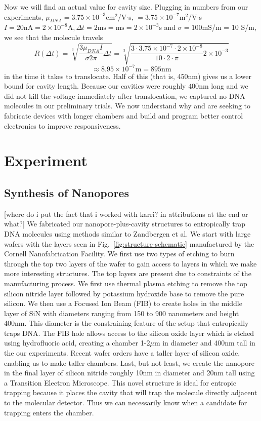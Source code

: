 \documentclass[aps,prl,preprint,groupedaddress]{revtex4}
\begin{document}
Now we will find an actual value for cavity size.
Plugging in numbers from our experiments, \(\mu_{DNA} = 3.75 \times 10^{-3}\)cm$^2$/V$\cdot$s, \( = 3.75 \times 10^{-7}\)m$^2$/V$\cdot$s \cite{mobility} \(I = 20 \mathrm{nA} = 2\times 10^{-8}\mathrm{A}, \Delta t = 2\mathrm{ms} = \mathrm{ms} = 2 \times 10^{-3}\)s and \(\sigma = 100\)mS/m = 10 S/m\cite{CRC}, we see that the molecule travels \[R(\Delta t) = \sqrt[3]{\frac{3 \mu_{DNA} I}{\sigma 2 \pi}\Delta t} = \sqrt[3]{\frac{3\cdot 3.75\times 10^{-7}\cdot 2\times10^{-8}}{10\cdot 2\cdot \pi} 2\times10^{-3}}\] \[\approx 8.95 \times 10^{-7}\mathrm{m} = 895 \mathrm{nm} \] in the time it takes to translocate.
Half of this (that is, 450nm) gives us a lower bound for cavity length.
Because our cavities were roughly \(400\)nm long and we did not kill the voltage immediately after translocation, we captured no DNA molecules in our preliminary trials.
We now understand why and are seeking to fabricate devices with longer chambers and build and program better control electronics to improve responsiveness.


\section{Experiment}

\subsection{Synthesis of Nanopores}

[where do i put the fact that i worked with karri? in attributions at the end or what?]
We fabricated our nanopore-plus-cavity structures to entropically trap DNA molecules using methods similar to Zandbergen et al.\cite{nanopore-fabrication}
We start with large wafers with the layers seen in Fig.~\ref{fig:structure-schematic} manufactured by the Cornell Nanofabrication Facility.
We first use two types of etching to burn through the top two layers of the wafer to gain access to layers in which we make more interesting structures.
The top layers are present due to constraints of the manufacturing process.
We first use thermal plasma etching to remove the top silicon nitride layer followed by potassium hydroxide base to remove the pure silicon.
We then use a Focused Ion Beam (FIB) to create holes in the middle layer of SiN with diameters ranging from 150 to 900 nanometers and height 400nm.
This diameter is the constraining feature of the setup that entropically traps DNA.
The FIB hole allows access to the silicon oxide layer which is etched using hydrofluoric acid, creating a chamber 1-2\(\mu\)m in diameter and 400nm tall in the our experiments.
Recent wafer orders have a taller layer of silicon oxide, enabling us to make taller chambers.
Last, but not least, we create the nanopore in the final layer of silicon nitride roughly 10nm in diameter and 20nm tall using a Transition Electron Microscope.
This novel structure is ideal for entropic trapping because it places the cavity that will trap the molecule directly adjacent to the molecular detector.
Thus we can necessarily know when a candidate for trapping enters the chamber.
\end{document}
